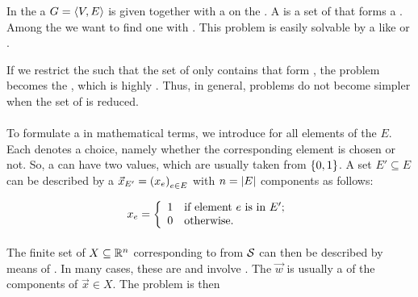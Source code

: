 \begin{definition}
In the  a  $G=\left\langle V,E \right\rangle$ is given together with a  on the . A  is a set of  that forms a . Among the  we want to find one with . This problem is easily solvable by a  like  or .

\begin{definition}
If we restrict the  such that the set of  only contains  that form , the problem becomes the , which is highly . Thus, in general, problems do not become simpler when the set of  is reduced.
\end{definition}

\paragraph{}
To formulate a  in mathematical terms, we introduce  for all elements of the  $E$. Each  denotes a choice, namely whether the corresponding element is chosen or not. So, a  can have two values, which are usually taken from $\left\{ 0,1 \right\}$. A set $E'\subseteq E$ can be described by a  $\vec{x}_{E'}=\left( x_e \right)_{e\in E}$ with $n=\left| E \right|$ components as follows:

\begin{equation}
x_e=\left\{\begin{array}{ll} 1&\mbox{if element $e$ is in $E'$;}\\0&\mbox{otherwise.} \end{array}\right.
\end{equation}

\paragraph{}
The finite set of  $X\subseteq\mathbb{R}^n$ corresponding to  from $\mathcal{S}$ can then be described by means of . In many cases, these  are  and involve . The  $\vec{w}$ is usually a  of the components of $\vec{x}\in X$. The problem is then


\end{definition}
